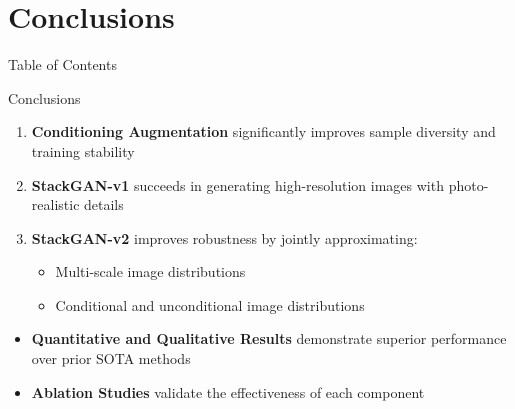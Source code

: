 \documentclass{beamer}
\begin{document}

\section{Conclusions}
\begin{frame}{Table of Contents}
    \tableofcontents[currentsection]
\end{frame}

\begin{frame}{Conclusions}
    \begin{enumerate}
        \item \textbf{Conditioning Augmentation} significantly improves sample diversity and training stability
        \item \textbf{StackGAN-v1} succeeds in generating high-resolution images with photo-realistic details
        \item \textbf{StackGAN-v2} improves robustness by jointly approximating:
        \begin{itemize}
            \item Multi-scale image distributions
            \item Conditional and unconditional image distributions
        \end{itemize}
    \end{enumerate}
    \begin{itemize}
        \item \textbf{Quantitative and Qualitative Results} demonstrate superior performance over prior SOTA methods
        \item \textbf{Ablation Studies} validate the effectiveness of each component
    \end{itemize}
\end{frame}
\end{document}
